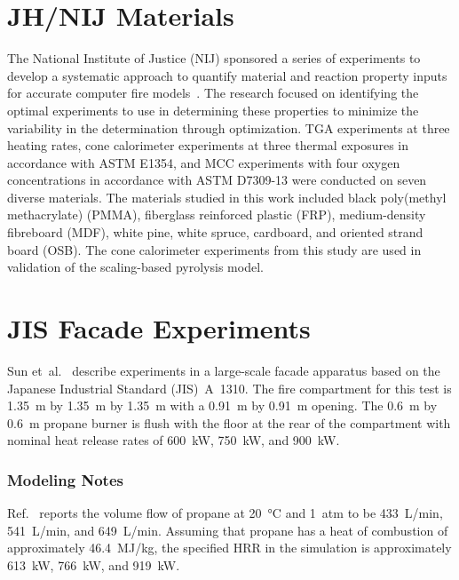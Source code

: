 \FloatBarrier

\section{JH/NIJ Materials}
\label{JH_NIJ_Description}

The National Institute of Justice (NIJ) sponsored a series of experiments to develop a systematic approach to quantify material and reaction property inputs for accurate computer fire models~\cite{Lattimer:NIJ19}. The research focused on identifying the optimal experiments to use in determining these properties to minimize the variability in the determination through optimization. TGA experiments at three heating rates, cone calorimeter experiments at three thermal exposures in accordance with ASTM E1354, and MCC experiments with four oxygen concentrations in accordance with ASTM D7309-13 were conducted on seven diverse materials. The materials studied in this work included black poly(methyl methacrylate) (PMMA), fiberglass reinforced plastic (FRP), medium-density fibreboard (MDF), white pine, white spruce, cardboard, and oriented strand board (OSB). The cone calorimeter experiments from this study are used in validation of the scaling-based pyrolysis model.


\section{JIS Facade Experiments}
\label{JIS_Facade_Description}

Sun et~al.~\cite{Sun:FAM2024} describe experiments in a large-scale facade apparatus based on the Japanese Industrial Standard (JIS)~A~1310. The fire compartment for this test is 1.35~m by 1.35~m by 1.35~m with a 0.91~m by 0.91~m opening. The 0.6~m by 0.6~m propane burner is flush with the floor at the rear of the compartment with nominal heat release rates of 600~kW, 750~kW, and 900~kW.

\subsubsection{Modeling Notes}

Ref.~\cite{Sun:FAM2024} reports the volume flow of propane at 20~\unit{\degreeCelsius} and 1~atm to be 433~L/min, 541~L/min, and 649~L/min. Assuming that propane has a heat of combustion of approximately 46.4~MJ/kg, the specified HRR in the simulation is approximately 613~kW, 766~kW, and 919~kW.

